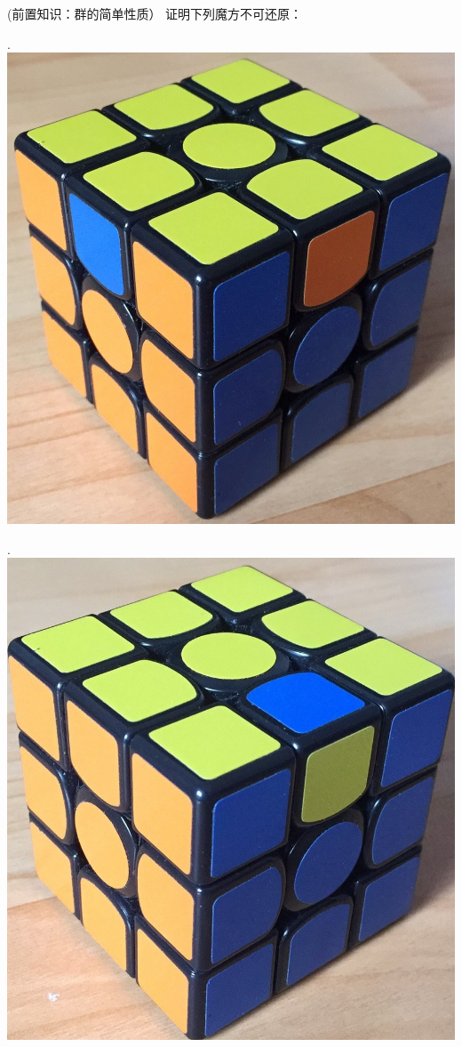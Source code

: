 \documentclass[UTF8, a4paper, 12pt, oneside, twocolumn]{article}
\numberwithin{equation}{section}
\numberwithin{figure}{section}
\numberwithin{table}{section}
\newif\ifproof
\newenvironment{Ex}[1][]{\prooffalse \begin{EExercise}{#1}{}}%
{\ifproof%
\hfill\ensuremath{\square}\end{Proof}%
\fi%
\end{EExercise}}
\begin{document}
\begin{Ex}[(前置知识：群的简单性质）]
证明下列魔方不可还原：\\
\begin{minipage}{0.3\linewidth}
.
\includegraphics[width=\linewidth]{jh.jpg}
\end{minipage}
\begin{minipage}{0.3\linewidth}
.
\includegraphics[width=\linewidth]{zl.jpg}

\end{minipage}
\end{Ex}
\end{document}
